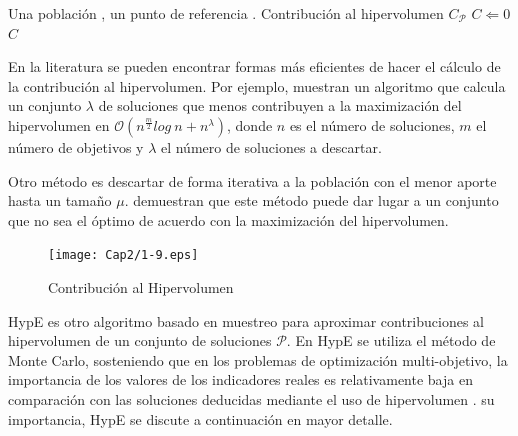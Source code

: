    \begin{algorithm}
  \begin{algorithmic}[1]			
		\REQUIRE Una poblaci\'on \DIFdelbegin {}\DIFdelend \DIFaddbegin {}\DIFaddend , un punto de referencia \DIFdelbegin {}\DIFdelend \DIFaddbegin {}\DIFaddend .		
		\ENSURE Contribuci\'on al hipervolumen $C_{\mathcal{P}}$
		\STATE $C\Leftarrow 0$
			\STATE \DIFdelbegin {}\DIFdelend \DIFaddbegin {}\DIFaddend \ENDWHILE
		\RETURN $C$
  \end{algorithmic}
  \caption{$estimandoContribucion\left(\mathcal{P}\right)$}
  \label{alg:hvcont}
  \end{algorithm}

   En la literatura se pueden encontrar formas m\'as eficientes de hacer el c\'alculo de la contribuci\'on al 
   hipervolumen. Por ejemplo, \cite{bringmann} muestran un algoritmo que calcula un conjunto $\lambda$ de soluciones 
   que menos contribuyen a la maximizaci\'on del hipervolumen en $\mathcal{O}(n^{\frac{m}{2}} log~n + n^{\lambda})$, 
   donde $n$ es el n\'umero de soluciones, $m$ el n\'umero de objetivos y $\lambda$ el n\'umero de soluciones a 
   descartar.

    Otro m\'etodo es descartar de forma iterativa a la poblaci\'on con el menor aporte hasta un tama\~no $\mu$. 
    \cite{Bringmann2} demuestran que este m\'etodo puede dar lugar a un conjunto que no sea el \'optimo de acuerdo con la 
    maximizaci\'on del hipervolumen. 

    \begin{figure}
    \centering
    \texttt{[image: Cap2/1-9.eps]}
    \caption{Contribuci\'on al Hipervolumen}
    \label{fig:hypcont}
    \end{figure}

    HypE es otro algoritmo basado en muestreo para aproximar \DIFdelbegin {}\DIFdelend \DIFaddbegin {}\DIFaddend contribuciones al hipervolumen de un conjunto de 
    soluciones $\mathcal{P}$. En HypE se utiliza el m\'etodo de Monte Carlo, sosteniendo que en los 
    problemas de optimizaci\'on multi-objetivo, la importancia de los valores de los indicadores reales es relativamente baja 
    en comparaci\'on con las soluciones deducidas mediante el uso de hipervolumen \cite{Bader11}. \DIFdelbegin {}\DIFdelend \DIFaddbegin {}\DIFaddend su importancia, HypE
    se discute a continuaci\'on en mayor detalle.

